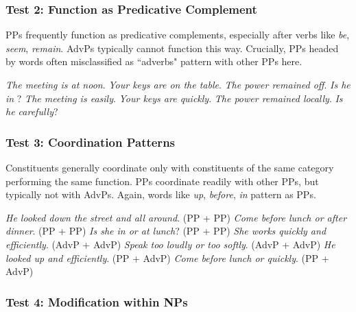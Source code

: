 \subsubsection*{Test 2: Function as Predicative Complement}\label{sec:test-predcomp}

PPs frequently function as predicative complements, especially after verbs like \textit{be}, \textit{seem}, \textit{remain}. AdvPs typically cannot function this way. Crucially, PPs headed by words often misclassified as ``adverbs" pattern with other PPs here.

\ea\label{ex:pp-predcomp} %
    \ea \textit{The meeting is {\ob}at noon\cb}.
    \ex \textit{Your keys are {\ob}on the table\cb}.
    \ex \textit{The power remained {\ob}off\cb}. %
    \ex \textit{Is he {\ob}in\cb} ? %
    \z
\z
\ea\label{ex:advp-predcomp} %
    \ea *\textit{The meeting is {\ob}easily\cb}.
    \ex *\textit{Your keys are {\ob}quickly\cb}.
    \ex *\textit{The power remained {\ob}locally\cb}.
    \ex *\textit{Is he {\ob}carefully\cb}?
    \z
\z

\subsubsection*{Test 3: Coordination Patterns}\label{sec:test-coordination}

Constituents generally coordinate only with constituents of the same category performing the same function. PPs coordinate readily with other PPs, but typically not with AdvPs. Again, words like \textit{up}, \textit{before}, \textit{in} pattern as PPs.

\ea\label{ex:pp-coord} %
    \ea \textit{He looked {\ob}down the street{\cb} and {\ob}all around\cb}. (PP + PP)
    \ex \textit{Come {\ob}before lunch{\cb} or {\ob}after dinner\cb}. (PP + PP)
    \ex \textit{Is she {\ob}in{\cb} or {\ob}at lunch\cb}? (PP + PP)
    \z
\z
\ea\label{ex:advp-coord} %
    \ea \textit{She works {\ob}quickly{\cb} and {\ob}efficiently\cb}. (AdvP + AdvP)
    \ex \textit{Speak {\ob}too loudly{\cb} or {\ob}too softly\cb}. (AdvP + AdvP)
    \z
\z
\ea\label{ex:mixed-coord} %
    \ea *\textit{He looked {\ob}up{\cb} and {\ob}efficiently\cb}. (PP + AdvP)
    \ex *\textit{Come {\ob}before lunch{\cb} or {\ob}quickly\cb}. (PP + AdvP)
    \z
\z

\subsubsection*{Test 4: Modification within NPs}\label{sec:test-np-mod}

